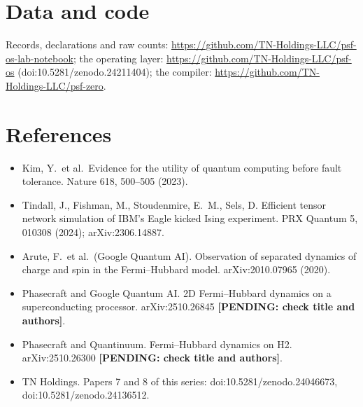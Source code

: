 \documentclass[10pt,a4paper]{article}
\newcommand{\pending}[1]{\textbf{[PENDING: #1]}}
\begin{document}
\section*{Data and code}
Records, declarations and raw counts: \url{https://github.com/TN-Holdings-LLC/psf-os-lab-notebook}; the operating
layer: \url{https://github.com/TN-Holdings-LLC/psf-os} (doi:10.5281/zenodo.24211404); the compiler:
\url{https://github.com/TN-Holdings-LLC/psf-zero}.

\section*{References}
\begin{itemize}
\item Kim, Y.\ et al.\ Evidence for the utility of quantum computing before fault tolerance. Nature 618, 500--505 (2023).
\item Tindall, J., Fishman, M., Stoudenmire, E.\ M., Sels, D. Efficient tensor network simulation of IBM's Eagle kicked
Ising experiment. PRX Quantum 5, 010308 (2024); arXiv:2306.14887.
\item Arute, F.\ et al.\ (Google Quantum AI). Observation of separated dynamics of charge and spin in the Fermi--Hubbard
model. arXiv:2010.07965 (2020).
\item Phasecraft and Google Quantum AI. 2D Fermi--Hubbard dynamics on a superconducting processor. arXiv:2510.26845
\pending{check title and authors}.
\item Phasecraft and Quantinuum. Fermi--Hubbard dynamics on H2. arXiv:2510.26300 \pending{check title and authors}.
\item TN Holdings. Papers 7 and 8 of this series: doi:10.5281/zenodo.24046673, doi:10.5281/zenodo.24136512.
\end{itemize}
\end{document}
